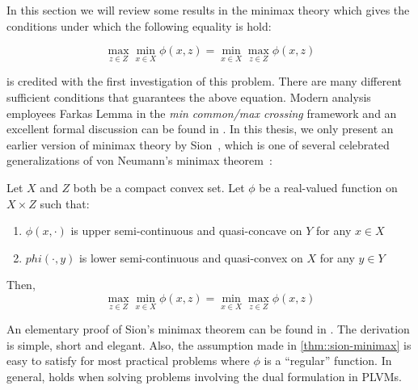 In this section we will review some results in the minimax theory which gives
the conditions under which the following equality is hold:

\begin{equation}
 \max\limits_{z \in Z} \min\limits_{x \in X} \phi(x,z) =
 \min\limits_{x \in X} \max\limits_{z \in Z} \phi(x,z)  \label{eq::minimax}
\end{equation}

\citeauthor{neumann1928theorie} is credited with the first investigation of this
problem.  There are many different sufficient conditions that guarantees the
above equation. Modern analysis employees Farkas Lemma in the \emph{min
common/max crossing} framework and an excellent formal discussion can be found
in \cite{bertsekas2003convex}. In this thesis, we only present an earlier
version of minimax theory by Sion~\cite{sion1958general}, which is one of
several celebrated generalizations of von Neumann's minimax
theorem~\cite{neumann1928theorie}:

\begin{thm}\label{thm::sion-minimax}
  Let $X$ and $Z$ both be a compact convex set. Let $\phi$ be a real-valued
  function on $X \times Z$ such that:
  \begin{enumerate}
    \item $\phi(x, \cdot)$ is upper semi-continuous and quasi-concave on $Y$ for
      any $x \in X$
    \item $phi(\cdot, y)$ is lower semi-continuous and quasi-convex on $X$ for
      any $y \in Y$
  \end{enumerate}
  Then,
  $$ \max\limits_{z \in Z} \min\limits_{x \in X} \phi(x,z) =
     \min\limits_{x \in X} \max\limits_{z \in Z} \phi(x,z)  $$
\end{thm}

An elementary proof of Sion's minimax theorem can be found in
\cite{komiya1988elementary}. The derivation is simple, short and elegant. Also,
the assumption made in \cref{thm::sion-minimax} is easy to satisfy for most
practical problems where $\phi$ is a ``regular'' function. In general,
 holds when solving problems involving the dual formulation in
PLVMs.










